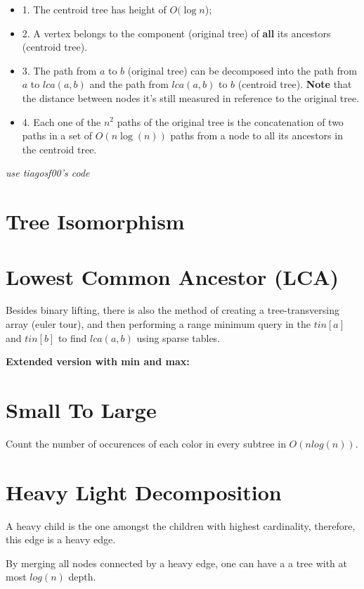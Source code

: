 \begin{itemize}
	\item 1. The centroid tree has height of $O(\log{n}$);

	\item 2. A vertex belongs to the component (original tree) of \textbf{all} its ancestors (centroid tree).
	
	\item 3. The path from $a$ to $b$ (original tree) can be decomposed into the path from $a$ to $lca(a,b)$ 
	and the path from $lca(a,b)$ to $b$ (centroid tree).
	\textbf{Note} that the distance between nodes it's still measured in reference to the original tree.
	
	\item 4. Each one of the $n^2$ paths of the original tree is the concatenation of 
	two paths in a set of $O(n \log(n))$ paths from a node to all its ancestors in the 
	centroid tree.
\end{itemize}

\textit{use tiagosf00's code}

\section{Tree Isomorphism}


\section{Lowest Common Ancestor (LCA)}
	Besides binary lifting, there is also the method of creating a tree-transversing array (euler tour),
	and then performing a range minimum query in the $tin[a]$ and $tin[b]$ to find $lca(a, b)$ using sparse tables.


	\textbf{Extended version with min and max:}


\section{Small To Large}

	Count the number of occurences of each color in every subtree in $O(n log(n))$.


\section{Heavy Light Decomposition}

	A heavy child is the one amongst the children with highest cardinality, therefore, this edge is a heavy edge.

	By merging all nodes connected by a heavy edge, one can have a a tree with at most $log(n)$ depth. 

